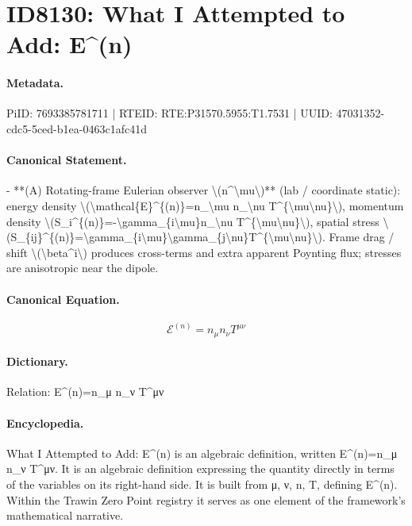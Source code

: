 \section*{ID8130: What I Attempted to Add: E\textasciicircum{}(n)}
\paragraph{Metadata.}
PiID: 7693385781711 | RTEID: RTE:P31570.5955:T1.7531 | UUID: 47031352-cdc5-5ced-b1ea-0463c1afc41d

\paragraph{Canonical Statement.}
- **(A) Rotating-frame Eulerian observer \textbackslash{}(n\textasciicircum{}\textbackslash{}mu\textbackslash{})** (lab / coordinate static): energy density \textbackslash{}(\textbackslash{}mathcal\{E\}\textasciicircum{}\{(n)\}=n\_\textbackslash{}mu n\_\textbackslash{}nu T\textasciicircum{}\{\textbackslash{}mu\textbackslash{}nu\}\textbackslash{}), momentum density \textbackslash{}(S\_i\textasciicircum{}\{(n)\}=-\textbackslash{}gamma\_\{i\textbackslash{}mu\}n\_\textbackslash{}nu T\textasciicircum{}\{\textbackslash{}mu\textbackslash{}nu\}\textbackslash{}), spatial stress \textbackslash{}(S\_\{ij\}\textasciicircum{}\{(n)\}=\textbackslash{}gamma\_\{i\textbackslash{}mu\}\textbackslash{}gamma\_\{j\textbackslash{}nu\}T\textasciicircum{}\{\textbackslash{}mu\textbackslash{}nu\}\textbackslash{}). Frame drag / shift \textbackslash{}(\textbackslash{}beta\textasciicircum{}i\textbackslash{}) produces cross-terms and extra apparent Poynting flux; stresses are anisotropic near the dipole.

\paragraph{Canonical Equation.}
\[
\mathcal{E}^{(n)}=n_\mu n_\nu T^{\mu\nu}
\]

\paragraph{Dictionary.}
Relation: E\textasciicircum{}(n)=n\_μ n\_ν T\textasciicircum{}μν

\paragraph{Encyclopedia.}
What I Attempted to Add: E\textasciicircum{}(n) is an algebraic definition, written E\textasciicircum{}(n)=n\_μ n\_ν T\textasciicircum{}μν. It is an algebraic definition expressing the quantity directly in terms of the variables on its right-hand side. It is built from μ, ν, n, T, defining E\textasciicircum{}(n). Within the Trawin Zero Point registry it serves as one element of the framework's mathematical narrative.
